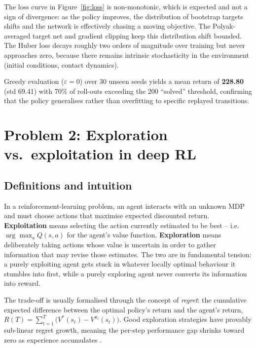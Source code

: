 \documentclass[11pt,a4paper]{article}
\begin{document}
The loss curve in Figure~\ref{fig:loss} is non-monotonic, which is
expected and not a sign of divergence: as the policy improves, the
distribution of bootstrap targets shifts and the network is effectively
chasing a moving objective. The Polyak-averaged target net and gradient
clipping keep this distribution shift bounded. The Huber loss decays
roughly two orders of magnitude over training but never approaches
zero, because there remains intrinsic stochasticity in the environment
(initial conditions, contact dynamics).

Greedy evaluation ($\varepsilon = 0$) over 30 unseen seeds yields a
mean return of \textbf{228.80} (std 69.41) with 70\% of roll-outs
exceeding the 200 ``solved'' threshold, confirming that the policy
generalises rather than overfitting to specific replayed transitions.

\newpage
\section{Problem 2: Exploration vs.\ exploitation in deep RL}

\subsection{Definitions and intuition}
In a reinforcement-learning problem, an agent interacts with an unknown
MDP and must choose actions that maximise expected discounted return.
\textbf{Exploitation} means selecting the action currently estimated to
be best -- i.e.\ $\arg\max_a Q(s, a)$ for the agent's value function.
\textbf{Exploration} means deliberately taking actions whose value is
uncertain in order to gather information that may revise those
estimates. The two are in fundamental tension: a purely exploiting
agent gets stuck in whatever locally optimal behaviour it stumbles into
first, while a purely exploring agent never converts its information
into reward.

The trade-off is usually formalised through the concept of
\emph{regret}: the cumulative expected difference between the optimal
policy's return and the agent's return,
$R(T) = \sum_{t=1}^{T}\bigl(V^{*}(s_t) - V^{\pi_t}(s_t)\bigr)$.
Good exploration strategies have provably sub-linear regret growth,
meaning the per-step performance gap shrinks toward zero as experience
accumulates \cite{sutton2018}.
\end{document}

